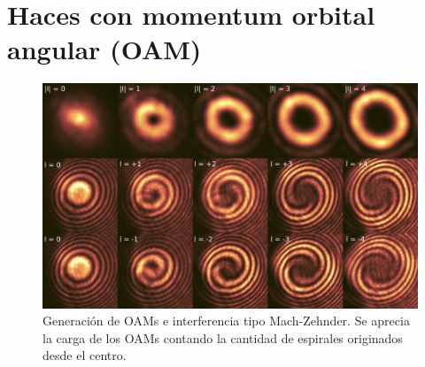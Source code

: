 \chapter{Haces con momentum orbital angular (OAM)}

\begin{figure}[H]
	\centering
	\includegraphics[width=\linewidth]{media/OAM-free.png}
	\caption[Generación de OAMs e interferencia tipo Mach-Zehnder.]{Generación de OAMs e interferencia tipo Mach-Zehnder. Se aprecia la carga de los OAMs contando la cantidad de espirales originados desde el centro.}
\end{figure}